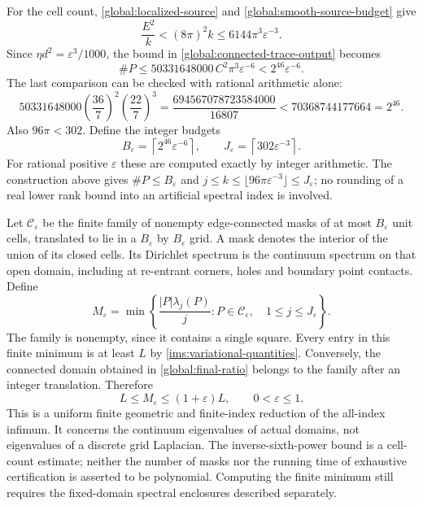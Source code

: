 \documentclass[11pt,reqno]{amsart}
\numberwithin{equation}{section}
\newcommand{\abs}[1]{\lvert#1\rvert}
\begin{document}
For the cell count, \eqref{global:localized-source} and
\eqref{global:smooth-source-budget} give
\[
 \frac{E^2}{k}<(8\pi)^2k
       \leq6144\pi^3\varepsilon^{-3}.
\]
Since $\eta d^2=\varepsilon^3/1000$, the bound in
\eqref{global:connected-trace-output} becomes
\begin{equation}
 \#P\leq50331648000\,C^2\pi^3\varepsilon^{-6}
             <2^{46}\varepsilon^{-6}.
 \label{global:final-cell-count}
\end{equation}
The last comparison can be checked with rational arithmetic alone:
\[
 50331648000\left(\frac{36}{7}\right)^2
             \left(\frac{22}{7}\right)^3
  =\frac{694567078723584000}{16807}
  <70368744177664=2^{46}.
\]
Also $96\pi<302$.  Define the integer budgets
\begin{equation}
 B_{\varepsilon}=\left\lceil2^{46}\varepsilon^{-6}\right\rceil,
 \qquad
 J_{\varepsilon}=\left\lceil302\varepsilon^{-3}\right\rceil.
 \label{global:rational-budgets}
\end{equation}
For rational positive $\varepsilon$ these are computed exactly by
integer arithmetic.  The construction above gives
$\#P\leq B_{\varepsilon}$ and
$j\leq k\leq\lfloor96\pi\varepsilon^{-3}\rfloor
\leq J_{\varepsilon}$; no rounding of a real lower rank bound into
an artificial spectral index is involved.

Let $\mathcal C_{\varepsilon}$ be the finite family of nonempty
edge-connected masks of at most $B_{\varepsilon}$ unit cells,
translated to lie in a $B_{\varepsilon}$ by
$B_{\varepsilon}$ grid.  A mask denotes the interior of the union
of its closed cells.  Its Dirichlet spectrum is the continuum
spectrum on that open domain, including at re-entrant corners,
holes and boundary point contacts.  Define
\begin{equation}
 M_{\varepsilon}
   =\min\left\{
       \frac{\abs P\lambda_j(P)}j:
       P\in\mathcal C_{\varepsilon},\quad
       1\leq j\leq J_{\varepsilon}\right\}.
 \label{global:finite-minimum}
\end{equation}
The family is nonempty, since it contains a single square.  Every
entry in this finite minimum is at least $L$ by
\eqref{ims:variational-quantities}.  Conversely, the connected
domain obtained in \eqref{global:final-ratio} belongs to the
family after an integer translation.  Therefore
\begin{equation}
 L\leq M_{\varepsilon}\leq(1+\varepsilon)L,
 \qquad 0<\varepsilon\leq1.
 \label{global:catalogue-approximation}
\end{equation}
This is a uniform finite geometric and finite-index reduction of the
all-index infimum.  It concerns the continuum eigenvalues of actual
domains, not eigenvalues of a discrete grid Laplacian.  The
inverse-sixth-power bound is a cell-count estimate; neither the
number of masks nor the running time of exhaustive certification
is asserted to be polynomial.  Computing the finite minimum still
requires the fixed-domain spectral enclosures described separately.
\end{document}
